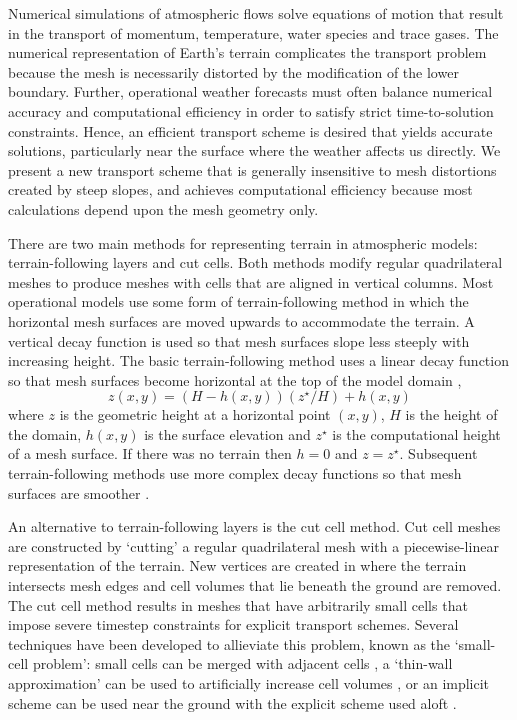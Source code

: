 Numerical simulations of atmospheric flows solve equations of motion that result in the transport of momentum, temperature, water species and trace gases.  The numerical representation of Earth's terrain complicates the transport problem because the mesh is necessarily distorted by the modification of the lower boundary.  Further, operational weather forecasts must often balance numerical accuracy and computational efficiency in order to satisfy strict time-to-solution constraints.  Hence, an efficient transport scheme is desired that yields accurate solutions, particularly near the surface where the weather affects us directly.
We present a new transport scheme that is generally insensitive to mesh distortions created by steep slopes, and achieves computational efficiency because most calculations depend upon the mesh geometry only.


There are two main methods for representing terrain in atmospheric models: terrain-following layers and cut cells.  Both methods modify regular quadrilateral meshes to produce meshes with cells that are aligned in vertical columns.  Most operational models use some form of terrain-following method in which the horizontal mesh surfaces are moved upwards to accommodate the terrain.  A vertical decay function is used so that mesh surfaces slope less steeply with increasing height.  The basic terrain-following method uses a linear decay function so that mesh surfaces become horizontal at the top of the model domain \citep{galchen-somerville1975},
\begin{equation}
	z(x,y) = \left( H - h(x,y) \right) \left( z^\star / H \right) + h(x,y) \label{eqn:btf}
\end{equation}
where $z$ is the geometric height at a horizontal point $(x, y)$, $H$ is the height of the domain, $h(x,y)$ is the surface elevation and $z^\star$ is the computational height of a mesh surface.  If there was no terrain then $h = 0$ and $z = z^\star$.
Subsequent terrain-following methods use more complex decay functions so that mesh surfaces are smoother \citep{simmons-burridge1981,schaer2002,leuenberger2010,klemp2011}.

An alternative to terrain-following layers is the cut cell method.  Cut cell meshes are constructed by `cutting' a regular quadrilateral mesh with a piecewise-linear representation of the terrain.  New vertices are created in where the terrain intersects mesh edges and cell volumes that lie beneath the ground are removed.  The cut cell method results in meshes that have arbitrarily small cells that impose severe timestep constraints for explicit transport schemes.  Several techniques have been developed to allieviate this problem, known as the `small-cell problem': small cells can be merged with adjacent cells \citep{yamazaki2016}, a `thin-wall approximation' can be used to artificially increase cell volumes \citep{steppeler2002}, or an implicit scheme can be used near the ground with the explicit scheme used aloft \citep{jebens2011}.

